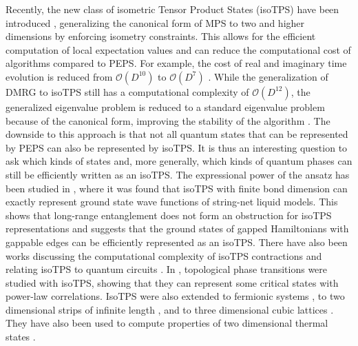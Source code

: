 Recently, the new class of isometric Tensor Product States (isoTPS) have been introduced \cite{cite:isometric_tensor_network_states_in_two_dimensions, cite:conversion_of_PEPS_into_a_canonical_form, cite:DMRG_approach_to_optimizing_2D_tensor_networks}, generalizing the canonical form of MPS to two and higher dimensions by enforcing isometry constraints. This allows for the efficient computation of local expectation values and can reduce the computational cost of algorithms compared to PEPS. For example, the cost of real and imaginary time evolution is reduced from $\mathcal{O}(D^{10})$ to $\mathcal{O}(D^7)$ \cite{cite:isometric_tensor_network_states_in_two_dimensions}. While the generalization of DMRG to isoTPS still has a computational complexity of $\mathcal{O}(D^{12})$, the generalized eigenvalue problem is reduced to a standard eigenvalue problem because of the canonical form, improving the stability of the algorithm \cite{cite:efficient_simulation_of_dynamics_in_two_dimensional_quantum_spin_systems}. The downside to this approach is that not all quantum states that can be represented by PEPS can also be represented by isoTPS. It is thus an interesting question to ask which kinds of states and, more generally, which kinds of quantum phases can still be efficiently written as an isoTPS. The expressional power of the ansatz has been studied in \cite{cite:isometric_tensor_network_representation_of_string_net_liquids}, where it was found that isoTPS with finite bond dimension can exactly represent ground state wave functions of string-net liquid models. This shows that long-range entanglement does not form an obstruction for isoTPS representations and suggests that the ground states of gapped Hamiltonians with gappable edges can be efficiently represented as an isoTPS. There have also been works discussing the computational complexity of isoTPS contractions \cite{cite:computational_complexity_of_isometric_tensor_network_states} and relating isoTPS to quantum circuits \cite{cite:sequential_generation_of_projected_entangled_pair_states, cite:quantum_circuits_for_2D_isometric_tensor_networks}. In \cite{cite:topological_quantum_phase_transitions_in_2D_isometric_tensor_networks}, topological phase transitions were studied with isoTPS, showing that they can represent some critical states with power-law correlations. IsoTPS were also extended to fermionic systems \cite{cite:fermionic_isometric_tensor_network_states}, to two dimensional strips of infinite length \cite{cite:two_dimensional_isometric_tensor_networks_on_infinite_strip}, and to three dimensional cubic lattices \cite{cite:three_dimensional_isometric_tensor_networks}. They have also been used to compute properties of two dimensional thermal states \cite{cite:isometric_tensor_network_representation_of_2D_thermal_states}. \par

